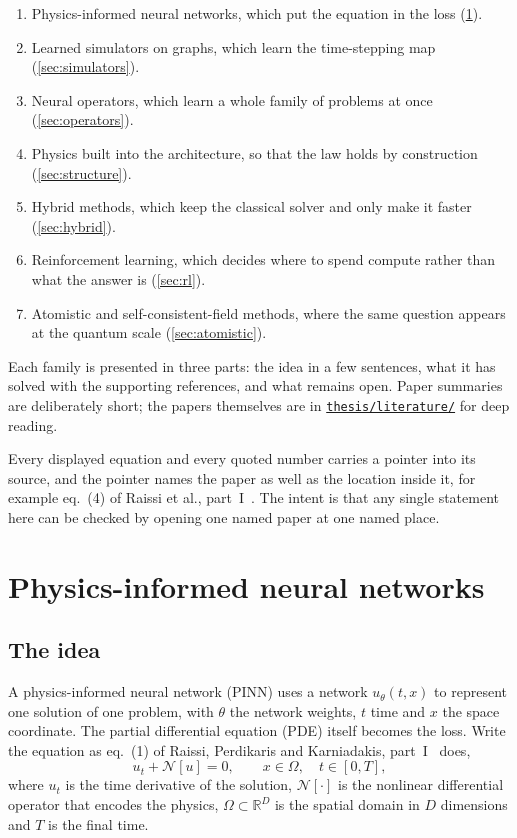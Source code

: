 \documentclass[11pt, a4paper]{article}
\newcommand{\literaturelink}{\href{https://github.com/blockskode/uio-thesis/tree/main/thesis/literature}{\texttt{thesis/literature/}}}
\begin{document}
\begin{enumerate}[itemsep=1pt, topsep=4pt]
  \item Physics-informed neural networks, which put the equation in the loss
  (\cref{sec:pinn}).
  \item Learned simulators on graphs, which learn the time-stepping map
  (\cref{sec:simulators}).
  \item Neural operators, which learn a whole family of problems at once
  (\cref{sec:operators}).
  \item Physics built into the architecture, so that the law holds by
  construction (\cref{sec:structure}).
  \item Hybrid methods, which keep the classical solver and only make it
  faster (\cref{sec:hybrid}).
  \item Reinforcement learning, which decides where to spend compute rather
  than what the answer is (\cref{sec:rl}).
  \item Atomistic and self-consistent-field methods, where the same question
  appears at the quantum scale (\cref{sec:atomistic}).
\end{enumerate}

Each family is presented in three parts: the idea in a few sentences, what it
has solved with the supporting references, and what remains open. Paper summaries
are deliberately short; the papers themselves are in \literaturelink{} for
deep reading.

Every displayed equation and every quoted number carries a pointer into its
source, and the pointer names the paper as well as the location inside it, for
example eq.~(4) of Raissi et al., part~I~\citep{raissi1}. The intent is that
any single statement here can be checked by opening one named paper at one
named place.

\section{Physics-informed neural networks}
\label{sec:pinn}

\subsection{The idea}

A physics-informed neural network (PINN) uses a network $u_\theta(t, x)$ to
represent one solution of one problem, with $\theta$ the network weights, $t$
time and $x$ the space coordinate. The partial differential equation (PDE)
itself becomes the loss. Write the equation as eq.~(1)
of Raissi, Perdikaris and Karniadakis, part~I~\citep{raissi1} does,
%
\begin{equation}
  u_t + \mathcal{N}[u] = 0,
  \qquad x \in \Omega, \quad t \in [0, T],
  \label{eq:pinnpde}
\end{equation}
%
where $u_t$ is the time derivative of the solution, $\mathcal{N}[\cdot]$ is
the nonlinear differential operator that encodes the physics, $\Omega
\subset \mathbb{R}^D$ is the spatial domain in $D$ dimensions and $T$ is the
final time.
\end{document}
